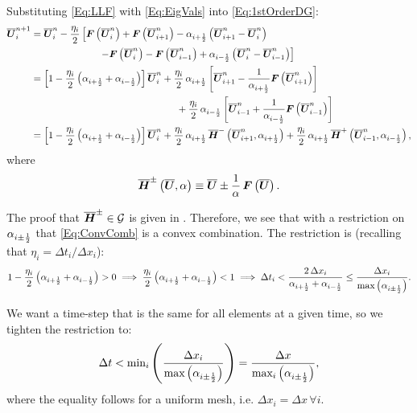 Substituting \eqref{Eq:LLF} with \eqref{Eq:EigVals} into \eqref{Eq:1stOrderDG}:
\begin{align}
    \ol{\bU}^{n+1}_{i}&=\ol{\bU}^{n}_{i}-\f{\eta_{i}}{2}\left[\bF\left(\ol{\bU}^{n}_{i}\right)+\bF\left(\ol{\bU}^{n}_{i+1}\right)-\alpha_{\iph}\left(\ol{\bU}^{n}_{i+1}-\ol{\bU}^{n}_{i}\right)\right.\nonumber\\
    &\left.\hspace{7em}-\bF\left(\ol{\bU}^{n}_{i}\right)-\bF\left(\ol{\bU}^{n}_{i-1}\right)+\alpha_{\imh}\left(\ol{\bU}^{n}_{i}-\ol{\bU}^{n}_{i-1}\right)\right]\nonumber\\
    &=\left[1-\f{\eta_{i}}{2}\left(\alpha_{\iph}+\alpha_{\imh}\right)\right]\ol{\bU}^{n}_{i}+\f{\eta_{i}}{2}\,\alpha_{\iph}\left[\ol{\bU}^{n}_{i+1}-\f{1}{\alpha_{\iph}}\bF\left(\ol{\bU}^{n}_{i+1}\right)\right]\nonumber\\
    &\hspace{15em}+\f{\eta_{i}}{2}\,\alpha_{\imh}\left[\ol{\bU}^{n}_{i-1}+\f{1}{\alpha_{\imh}}\bF\left(\ol{\bU}^{n}_{i-1}\right)\right]\nonumber\\
    &=\left[1-\f{\eta_{i}}{2}\left(\alpha_{\iph}+\alpha_{\imh}\right)\right]\ol{\bU}^{n}_{i}+\f{\eta_{i}}{2}\,\alpha_{\iph}\,\ol{\bH}^{-}\left(\ol{\bU}^{n}_{i+1},\alpha_{\iph}\right)+\f{\eta_{i}}{2}\,\alpha_{\iph}\,\ol{\bH}^{+}\left(\ol{\bU}^{n}_{i-1},\alpha_{\imh}\right),\label{Eq:ConvComb}
\end{align}
where
\begin{equation}\label{Eq:Hpm}
    \overline{\boldsymbol{H}}^{\pm}\left(\overline{\boldsymbol{U}},\alpha\right)\equiv\overline{\boldsymbol{U}}\pm\frac{1}{\alpha}\,\boldsymbol{F}\left(\overline{\boldsymbol{U}}\right).
\end{equation}

The proof that $\overline{\boldsymbol{H}}^{\pm}\in\mathcal{G}$ is given in \citet{Qin2016}. Therefore, we see that with a restriction on $\alpha_{i\pm\frac{1}{2}}$ that \eqref{Eq:ConvComb} is a convex combination. The restriction is (recalling that $\eta_{i}=\Delta t_{i}/\Delta x_{i}$):
\begin{equation}
    1-\frac{\eta_{i}}{2}\left(\alpha_{i+\frac{1}{2}}+\alpha_{i-\frac{1}{2}}\right)>0\implies\frac{\eta_{i}}{2}\left(\alpha_{i+\frac{1}{2}}+\alpha_{i-\frac{1}{2}}\right)<1\implies \Delta t_{i}<\frac{2\,\Delta x_{i}}{\alpha_{i+\frac{1}{2}}+\alpha_{i-\frac{1}{2}}}\leq\frac{\Delta x_{i}}{\text{max}\left(\alpha_{i\pm\frac{1}{2}}\right)}.
\end{equation}

We want a time-step that is the same for all elements at a given time, so we tighten the restriction to:
\begin{equation}
    \Delta t<\text{min}_{i}\left(\frac{\Delta x_{i}}{\text{max}\left(\alpha_{i\pm\frac{1}{2}}\right)}\right)=\frac{\Delta x}{\text{max}_{i}\left(\alpha_{i\pm\frac{1}{2}}\right)},
\end{equation}
where the equality follows for a uniform mesh, i.e. $\Delta x_{i}=\Delta x\,\forall i$.

